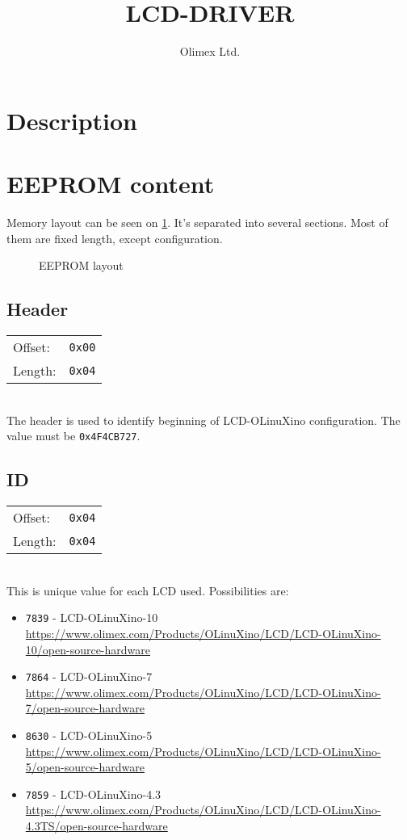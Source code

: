 \documentclass{article}
\title{LCD-DRIVER}
\author{Olimex Ltd.}
\newcommand{\regs}[2]{
	\begin{tabular}{l l}
		Offset: & \texttt{#1} \\
		Length: & \texttt{#2}
	\end{tabular} \\
	}
\begin{document}
	\maketitle
	\tableofcontents
	\listoffigures
	\pagebreak


	\section{Description}
	\begin{multicols}{2}
		\lipsum
	\end{multicols}

	\section{EEPROM content}
	
	Memory layout can be seen on \ref{fig:EEPROM_LAYOUT}. It's separated into several sections.
	Most of them are fixed length, except configuration.

	\begin{figure}[H]
		\centering
		
		\caption{EEPROM layout}
		\label{fig:EEPROM_LAYOUT}
	\end{figure}

	\subsection{Header}
	\regs{0x00}{0x04}

	The header is used to identify beginning of LCD-OLinuXino configuration. The value must be
	\texttt{0x4F4CB727}.

	\subsection{ID}
	\regs{0x04}{0x04}

	This is unique value for each LCD used. Possibilities are:
	\begin{itemize}
		\item \texttt{7839} - LCD-OLinuXino-10 \\
		\url{https://www.olimex.com/Products/OLinuXino/LCD/LCD-OLinuXino-10/open-source-hardware}

		\item \texttt{7864} - LCD-OLinuXino-7 \\
		\url{https://www.olimex.com/Products/OLinuXino/LCD/LCD-OLinuXino-7/open-source-hardware}

		\item \texttt{8630} - LCD-OLinuXino-5 \\
		\url{https://www.olimex.com/Products/OLinuXino/LCD/LCD-OLinuXino-5/open-source-hardware}

		\item \texttt{7859} - LCD-OLinuXino-4.3 \\
		\url{https://www.olimex.com/Products/OLinuXino/LCD/LCD-OLinuXino-4.3TS/open-source-hardware}
	\end{itemize}
\end{document}
